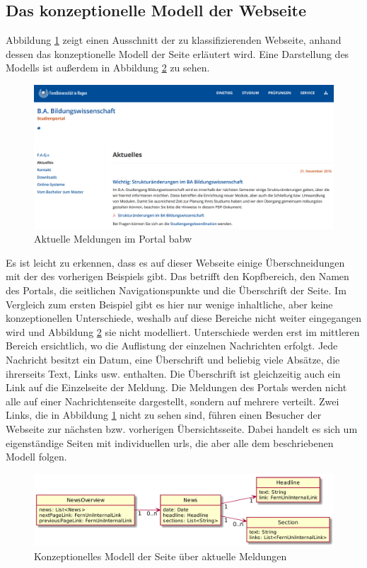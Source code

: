 \subsection{Das konzeptionelle Modell der Webseite}
    Abbildung \ref{image:findingNewsModelOverview} zeigt einen
    Ausschnitt der zu klassifizierenden Webseite,
    anhand dessen das konzeptionelle Modell der Seite erläutert wird.
    Eine Darstellung des Modells ist außerdem in Abbildung
    \ref{image:findingNewsModelUml} zu sehen.

    \begin{figure}[htb]
        \centering
        \includegraphics[width=\textwidth]{../resources/findings/case-study-2/news-overview.png}
        \caption{Aktuelle Meldungen im Portal \acrshort{babw}}
        \label{image:findingNewsModelOverview}
    \end{figure}

    Es ist leicht zu erkennen, dass es auf dieser Webseite einige Überschneidungen
    mit der des vorherigen Beispiels gibt.
    Das betrifft den Kopfbereich, den Namen des Portals,
    die seitlichen Navigationspunkte und die Überschrift der Seite.
    Im Vergleich zum ersten Beispiel gibt es hier nur wenige inhaltliche,
    aber keine konzeptionellen Unterschiede,
    weshalb auf diese Bereiche nicht weiter eingegangen wird und Abbildung
    \ref{image:findingNewsModelUml} sie nicht modelliert.
    Unterschiede werden erst im mittleren Bereich ersichtlich,
    wo die Auflistung der einzelnen Nachrichten erfolgt.
    Jede Nachricht besitzt ein Datum, eine Überschrift und beliebig viele Absätze,
    die ihrerseits Text, Links usw. enthalten.
    Die Überschrift ist gleichzeitig auch ein Link auf die Einzelseite der Meldung.
    Die Meldungen des Portals werden nicht alle auf einer Nachrichtenseite dargestellt,
    sondern auf mehrere verteilt.
    Zwei Links, die in Abbildung \ref{image:findingNewsModelOverview} nicht zu sehen sind,
    führen einen Besucher der Webseite zur nächsten bzw. vorherigen Übersichtsseite.
    Dabei handelt es sich um eigenständige Seiten mit individuellen \glspl{url},
    die aber alle dem beschriebenen Modell folgen.

    \begin{figure}[htb]
        \centering
        \includegraphics[scale=\imageScalingFactor]{../resources/findings/case-study-2/model.png}
        \caption{Konzeptionelles Modell der Seite über aktuelle Meldungen}
        \label{image:findingNewsModelUml}
    \end{figure}